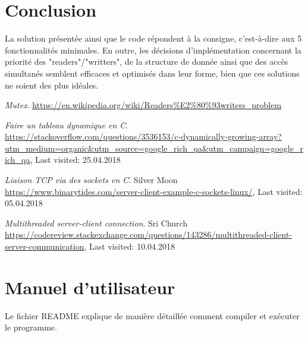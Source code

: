\documentclass[11pt,a4paper]{article}
\begin{document}
\section{Conclusion}
La solution présentée ainsi que le code répondent à la consigne, c'est-à-dire aux 5 fonctionnalités minimales. En outre, les décisions d'implémentation concernant la priorité des "readers"/"writters", de la structure de donnée ainsi que des accès simultanés semblent efficaces et optimisés dans leur forme, bien que ces solutions ne soient des plus idéales. 


\begin{thebibliography}{20}

\textit{Mutex}.	%
\url{https://en.wikipedia.org/wiki/Readers\%E2\%80\%93writers_problem}

\textit{Faire un tableau dynamique en C}.					    %
\url{https://stackoverflow.com/questions/3536153/c-dynamically-growing-array?utm_medium=organic&utm_source=google_rich_qa&utm_campaign=google_rich_qa},	%
Last visited: 25.04.2018							%

\textit{Liaison TCP via des sockets en C}.					    %
Silver Moon
\url{https://www.binarytides.com/server-client-example-c-sockets-linux/},	%
Last visited: 05.04.2018							%

\textit{Multithreaded server-client connection}.	    %
Sri Church
\url{https://codereview.stackexchange.com/questions/143286/multithreaded-client-server-communication},	%
Last visited: 10.04.2018							%
\end{thebibliography}




\appendix 
\renewcommand{\thesubsection}{\Alph{section}.\arabic{subsection}}

\section{Manuel d'utilisateur} \label{app:annexe}
Le fichier README explique de manière détaillée comment compiler et exécuter le programme.


\end{document}
